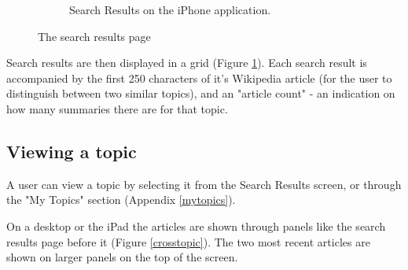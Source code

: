 \documentclass[12pt]{article}
\begin{document}
\begin{appendices}
\begin{figure}[ht!]
\begin{subfigure}[t]{0.3\textwidth}
   \caption{Search Results on the iPhone application.}
   \end{subfigure}
   \caption{The search results page}
   \label{crosssearching}
\end{figure}

Search results are then displayed in a grid (Figure \ref{crosssearching}). Each search result is accompanied by the first 250 characters of it's Wikipedia \cite{wikipedia} article (for the user to distinguish between two similar topics), and an "article count" - an indication on how many summaries there are for that topic.

\subsection{Viewing a topic}

A user can view a topic by selecting it from the Search Results screen, or through the "My Topics" section (Appendix \ref{mytopics}).

On a desktop or the iPad the articles are shown through panels like the search results page before it (Figure \ref{crosstopic}). The two most recent articles are shown on larger panels on the top of the screen. 


\end{appendices}
\end{document}
